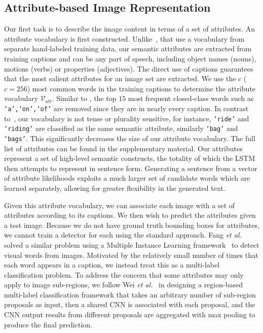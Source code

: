 \documentclass[10pt,journal,compsoc]{IEEEtran}
\newcommand{\etal}{\emph{et al.}}
\begin{document}
\subsection{Attribute-based Image Representation}
\label{subsec:Attributes_Predictor}
Our first task is to describe the image content in terms of a set of attributes. An attribute vocabulary is first constructed. Unlike~\cite{kulkarni2013babytalk,yang2011corpus}, that use a vocabulary from separate hand-labeled training data, our semantic attributes are extracted from training captions and can be any part of speech, including object names (nouns), motions (verbs) or properties (adjectives). The direct use of captions guarantees that the most salient attributes for an image set are extracted. We use the $c$ ($c=256$) most common words in the training captions to determine the attribute vocabulary $\mathcal{V}_{att}$. Similar to \cite{fang2014captions}, the top $15$ most frequent closed-class words such as \texttt{`a',`on',`of'}  are removed since they are in nearly every caption. In contrast to~\cite{fang2014captions}, our vocabulary is not tense or plurality sensitive, for instance, \texttt{`ride'} and \texttt{`riding'} are classified as the same semantic attribute, similarly \texttt{`bag'} and \texttt{`bags'}. This significantly decreases the size of our attribute vocabulary. The full list of attributes can be found in the supplementary material. Our attributes represent a set of high-level semantic constructs, the totality of which the LSTM then attempts to represent in sentence form. Generating a sentence from a vector of attribute likelihoods exploits a much larger set of candidate words which are learned separately, allowing for greater flexibility in the generated text.

Given this attribute vocabulary, we can associate each image with a set of attributes according to its captions. We then wish to predict the attributes given a test image. Because we do not have ground truth bounding boxes for attributes, we cannot train a detector for each using the standard approach. Fang \etal~\cite{fang2014captions} solved a similar problem using a Multiple Instance Learning framework~\cite{zhang2005multiple} to detect visual words from images. Motivated by the relatively small number of times that each word appears in a caption, we instead treat this as a multi-label classification problem. To address the concern that some attributes may only apply to image sub-regions, we follow Wei \etal~\cite{wei2014cnn} in designing a region-based multi-label classification framework that takes an arbitrary number of sub-region proposals as input, then a shared CNN is associated with each proposal, and the CNN output results from different proposals are aggregated with max pooling to produce the final prediction.
\end{document}

